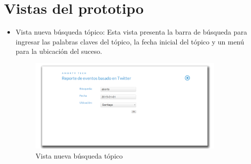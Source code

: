 \section{Vistas del prototipo}	
\begin{itemize}
	\item {Vista nueva búsqueda tópico}: Esta vista presenta la barra de búsqueda para ingresar las palabras claves del tópico, la fecha inicial del tópico y un menú para la ubicación del suceso. 
	\begin{figure}[H]
		\centering
		\includegraphics[width=0.9\textwidth]{imgs/vistas_newsearch.PNG}
		\caption{Vista nueva búsqueda tópico}
		\label{fig:vista_newsearch}
	\end{figure}
	

\end{itemize}
